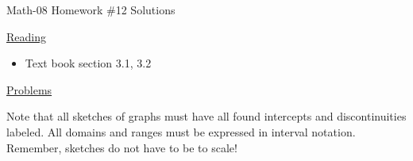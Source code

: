 \documentclass[letterpaper,12pt,fleqn]{article}
\begin{document}
\begin{center}
\Large Math-08 Homework \#12 Solutions
\end{center}

\vspace{0.5in}

\underline{Reading}

\begin{itemize}
\item Text book section 3.1, 3.2
\end{itemize}

\underline{Problems}

Note that all sketches of graphs must have all found intercepts and
discontinuities labeled. All domains and ranges must be expressed in
interval notation. Remember, sketches do not have to be to scale!
\end{document}
